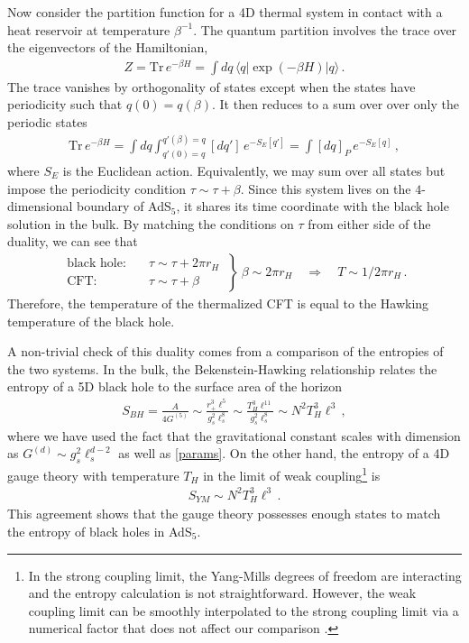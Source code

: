 \documentclass[../PhD.tex]{subfiles}
\begin{document}
Now consider the partition function for a 4D thermal system in contact with a heat reservoir at temperature $\beta^{-1}$. The quantum partition involves the trace over the eigenvectors of the Hamiltonian,
\begin{align}
\label{quantum par}
Z = \text{Tr} \, e^{- \beta H} = \int dq \, \langle q | \exp ( - \beta H ) | q \rangle \, .
\end{align}
The trace vanishes by orthogonality of states except when the states have periodicity such that $q(0) = q(\beta)$. It then reduces to a sum over over only the periodic states \cite{Schellekens}
\begin{align}
\label{cft trace}
\text{Tr} \, e^{ - \beta H} = \int dq \int^{q'(\beta)=q}_{q'(0)=q} [dq'] \, e^{-S_E[q']} = \int [dq]_P \, e^{-S_E[q]} \, ,
\end{align}
where $S_E$ is the Euclidean action. Equivalently, we may sum over all states but impose the periodicity condition $\tau \sim \tau + \beta$. Since this system lives on the $4$-dimensional boundary of AdS$_{5}$, it shares its time coordinate with the black hole solution in the bulk. By matching the conditions on $\tau$ from either side of the duality, we can see that 
\begin{align}
\label{temp/grav}
\left. \begin{aligned}
	\text{black hole:} &\quad \tau \sim \tau + 2\pi r_H \\
	\text{CFT:} &\quad \tau \sim \tau + \beta
	\end{aligned}
\: \right\} \: \beta \sim 2\pi r_H \quad \Rightarrow \quad T \sim 1/ 2\pi r_H \, .
\end{align}
Therefore, the temperature of the thermalized CFT is equal to the Hawking temperature of the black hole.

A non-trivial check of this duality comes from a comparison of the entropies of the two systems. In the bulk, the Bekenstein-Hawking relationship relates the entropy of a 5D black hole to the surface area of the horizon \cite{Bekenstein:1973ur}
\begin{align}
\label{bh dual entropy}
S_{BH} = \frac{A}{4G^{(5)}} \sim \frac{r_+^3 \ell^5}{g_s^2 \ell_s^8} \sim \frac{T_H^3 \ell^{11}}{g_s^2 \ell_s^8} \sim N^2 T_H^3 \ell^3 \, ,
\end{align}
where we have used the fact that the gravitational constant scales with dimension as $G^{(d)} \sim g_s^2 \ell_s^{d-2}$ as well as \eqref{params}. On the other hand, the entropy of a 4D gauge theory with temperature $T_H$ in the limit of weak coupling\footnote{ In the strong coupling limit, the Yang-Mills degrees of freedom are interacting and the entropy calculation is not straightforward. However, the weak coupling limit can be smoothly interpolated to the strong coupling limit via a numerical factor that does not affect our comparison \cite{gr-qc/0602037}.} is
\begin{align}
\label{gauge dual entropy}
S_{YM} \sim N^2 T_H^3 \ell^3 \, .
\end{align}
This agreement shows that the gauge theory possesses enough states to match the entropy of black holes in AdS$_5$.
\end{document}
